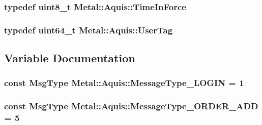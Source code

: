 \subsubsection[{Time\+In\+Force}]{\setlength{\rightskip}{0pt plus 5cm}typedef uint8\+\_\+t {\bf Metal\+::\+Aquis\+::\+Time\+In\+Force}}\label{namespaceMetal_1_1Aquis_afb13b4ac40f6f0b4f0085bfd9572b42d}
\hypertarget{namespaceMetal_1_1Aquis_a9e7c42d4dce76e920bc18eb66b799cf4}{}
\subsubsection[{User\+Tag}]{\setlength{\rightskip}{0pt plus 5cm}typedef uint64\+\_\+t {\bf Metal\+::\+Aquis\+::\+User\+Tag}}\label{namespaceMetal_1_1Aquis_a9e7c42d4dce76e920bc18eb66b799cf4}


\subsection{Variable Documentation}
\hypertarget{namespaceMetal_1_1Aquis_a103f484918d9c4a9f8531afdc07c99a7}{}
\subsubsection[{Message\+Type\+\_\+\+L\+O\+G\+I\+N}]{\setlength{\rightskip}{0pt plus 5cm}const {\bf Msg\+Type} Metal\+::\+Aquis\+::\+Message\+Type\+\_\+\+L\+O\+G\+I\+N = 1}\label{namespaceMetal_1_1Aquis_a103f484918d9c4a9f8531afdc07c99a7}
\hypertarget{namespaceMetal_1_1Aquis_aa5562d10850d07aa417f1ae32efc84e2}{}
\subsubsection[{Message\+Type\+\_\+\+O\+R\+D\+E\+R\+\_\+\+A\+D\+D}]{\setlength{\rightskip}{0pt plus 5cm}const {\bf Msg\+Type} Metal\+::\+Aquis\+::\+Message\+Type\+\_\+\+O\+R\+D\+E\+R\+\_\+\+A\+D\+D = 5}\label{namespaceMetal_1_1Aquis_aa5562d10850d07aa417f1ae32efc84e2}
